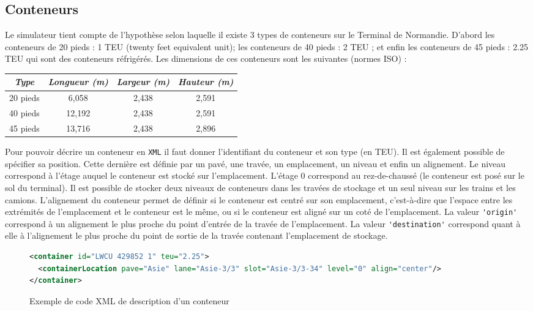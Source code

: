 \FloatBarrier

\subsection{Conteneurs}

Le simulateur tient compte de l'hypothèse selon laquelle il existe 3 types de conteneurs sur le Terminal de Normandie. D'abord les conteneurs de 20 pieds : 1 TEU (twenty feet equivalent unit); les conteneurs de 40 pieds : 2 TEU ; et enfin les conteneurs de 45 pieds : 2.25 TEU qui sont des conteneurs réfrigérés. Les dimensions de ces conteneurs sont les suivantes (normes ISO) :

\begin{center}
\footnotesize
\begin{tabular}{|c|c|c|c|}
  \hline
  \textbf{\textit{Type}} & \textbf{\textit{Longueur (m)}} & \textbf{\textit{Largeur (m)}} & \textbf{\textit{Hauteur (m)}} \tabularnewline
  \hline
  20 pieds & 6,058 & 2,438 & 2,591 \tabularnewline
  \hline
  40 pieds & 12,192 & 2,438 & 2,591 \tabularnewline
  \hline
  45 pieds & 13,716 & 2,438 & 2,896 \tabularnewline
  \hline
\end{tabular}
\end{center}

Pour pouvoir décrire un conteneur en \verb!XML! il faut donner l'identifiant du conteneur et son type (en TEU). Il est également possible de spécifier sa position. Cette dernière est définie par un pavé, une travée, un emplacement, un niveau et enfin un alignement. 
Le niveau correspond à l'étage auquel le conteneur est stocké sur l'emplacement. L'étage 0 correspond au rez-de-chaussé (le conteneur est posé sur le sol du terminal). Il est possible de stocker deux niveaux de conteneurs dans les travées de stockage et un seul niveau sur les trains et les camions.
L'alignement du conteneur permet de définir si le conteneur est centré sur son emplacement, c'est-à-dire que l'espace entre les extrémités de l'emplacement et le conteneur est le même, ou si le conteneur est aligné sur un coté de l'emplacement. La valeur \verb!'origin'! correspond à un alignement le plus proche du point d'entrée de la travée de l'emplacement. La valeur \verb!'destination'! correspond quant à elle à l'alignement le plus proche du point de sortie de la travée contenant l'emplacement de stockage.

\begin{figure}[ht]
\centering
 \begin{lstlisting}[language=XML]
<container id="LWCU 429852 1" teu="2.25">
  <containerLocation pave="Asie" lane="Asie-3/3" slot="Asie-3/3-34" level="0" align="center"/>
</container>
\end{lstlisting}
\caption{Exemple de code XML de description d'un conteneur}
\label{fig:simulation:conteneur}
\end{figure}


